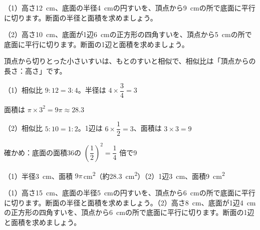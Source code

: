 \begin{reidai}[すいの断面]
（1）\nobreak 高さ\qty{12}{cm}、底面の半径\qty{4}{cm}の円すいを、頂点から\qty{9}{cm}の所で底面に平行に切ります。断面の半径と面積を求めましょう。\par
（2）\nobreak 高さ\qty{10}{cm}、底面が1辺\qty{6}{cm}の正方形の四角すいを、頂点から\qty{5}{cm}の所で底面に平行に切ります。断面の1辺と面積を求めましょう。\par
\kangaekata 頂点から切りとった小さいすいは、もとのすいと相似で、相似比は「頂点からの長さ：高さ」です。\par
\shiki （1）相似比 $9:12=3:4$。半径は $4\times\dfrac{3}{4}=3$\par
\hspace*{4.3\zw}面積は $\pi\times3^2=9\pi\approx28.3$\par
\hspace*{2.6\zw}（2）相似比 $5:10=1:2$。1辺は $6\times\dfrac{1}{2}=3$、面積は $3\times3=9$\par
\hspace*{4.3\zw}確かめ：底面の面積36の $\left(\dfrac{1}{2}\right)^2=\dfrac{1}{4}$ 倍で9\par
\kotae （1）\nobreak 半径\qty{3}{cm}、面積 $9\pi$\,\unit{cm^2}（約\qty{28.3}{cm^2}）\quad（2）\nobreak 1辺\qty{3}{cm}、面積\qty{9}{cm^2}
\end{reidai}

\begin{jibun}
（1）\nobreak 高さ\qty{15}{cm}、底面の半径\qty{5}{cm}の円すいを、頂点から\qty{6}{cm}の所で底面に平行に切ります。断面の半径と面積を求めましょう。（2）\nobreak 高さ\qty{8}{cm}、底面が1辺\qty{4}{cm}の正方形の四角すいを、頂点から\qty{6}{cm}の所で底面に平行に切ります。断面の1辺と面積を求めましょう。
\end{jibun}

